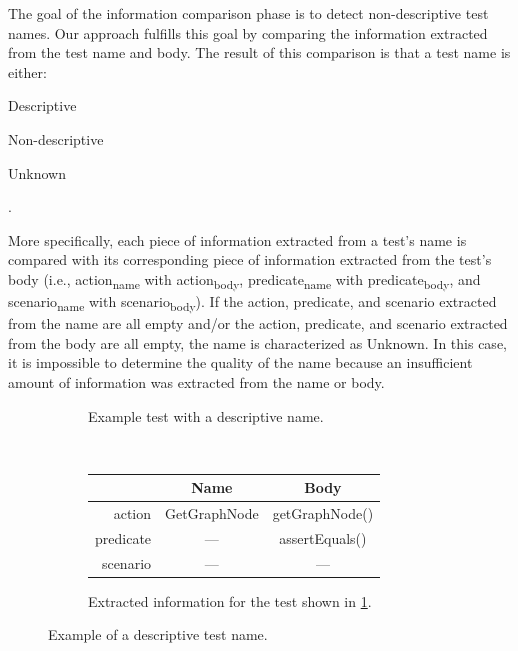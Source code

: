 \documentclass[proposal.tex]{subfiles}
\begin{document}
The goal of the information comparison phase is to detect non-descriptive test names.
%
Our approach fulfills this goal by comparing the information extracted from the test name and body.
%
The result of this comparison is that a test name is either:
\begin{enumerate*}[itemjoin*={{, or }}]
    \item Descriptive
    \item Non-descriptive
    \item Unknown
\end{enumerate*}.


More specifically, each piece of information extracted from a test's name is compared with its corresponding piece of information extracted from the test's body (i.e., action\textsubscript{name} with action\textsubscript{body}, predicate\textsubscript{name} with predicate\textsubscript{body}, and scenario\textsubscript{name} with scenario\textsubscript{body}).
% 
If the action, predicate, and scenario extracted from the name are all empty and\slash or the action, predicate, and scenario extracted from the body are all empty, the name is characterized as Unknown.
%
In this case, it is impossible to determine the quality of the name because an insufficient amount of information was extracted from the name or body.


\begin{figure}[t]
    \centering
    \begin{subfigure}{0.9\textwidth}
    \centering
        \caption{Example test with a descriptive name.}
        \label{PatternExample_detected4_code}
    \end{subfigure}
    \\[0.5ex]
    \begin{subfigure}{0.9\textwidth}
    \centering
        \begin{tabular}{rcc}
        \toprule
                  & Name    & Body    \\
        \midrule
        action    & GetGraphNode  & getGraphNode()     \\
        predicate & ---           & assertEquals()     \\
        scenario  & ---           & ---                \\
        \bottomrule
        \end{tabular}
        \caption{Extracted information for the test shown in \cref{PatternExample_detected4_code}.}
        \label{PatternExample_detected4}
    \end{subfigure}
    \caption{Example of a descriptive test name.}
    \label{fig:descriptive-examples}
\end{figure}
\end{document}
